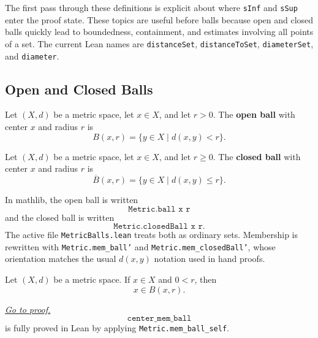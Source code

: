 \begin{remark*}
The first pass through these definitions is explicit about where \texttt{sInf}
and \texttt{sSup} enter the proof state. These topics are useful before balls
because open and closed balls quickly lead to boundedness, containment, and
estimates involving all points of a set. The current Lean names are
\texttt{distanceSet}, \texttt{distanceToSet}, \texttt{diameterSet}, and
\texttt{diameter}.
\end{remark*}

\subsection{Open and Closed Balls}

\begin{remark*}
\begin{definition*}
Let $(X,d)$ be a metric space, let $x\in X$, and let $r>0$. The
\textbf{open ball} with center $x$ and radius $r$ is
\[
  B(x,r)=\{y\in X\mid d(x,y)<r\}.
\]
\end{definition*}
\end{remark*}

\begin{remark*}
\begin{definition*}
Let $(X,d)$ be a metric space, let $x\in X$, and let $r\geq 0$. The
\textbf{closed ball} with center $x$ and radius $r$ is
\[
  \overline{B}(x,r)=\{y\in X\mid d(x,y)\leq r\}.
\]
\end{definition*}
\end{remark*}

\begin{remark*}
In mathlib, the open ball is written
\[
  \texttt{Metric.ball x r}
\]
and the closed ball is written
\[
  \texttt{Metric.closedBall x r}.
\]
The active file \texttt{MetricBalls.lean} treats both as ordinary sets.
Membership is rewritten with \texttt{Metric.mem\_ball'} and
\texttt{Metric.mem\_closedBall'}, whose orientation matches the usual
\(d(x,y)\) notation used in hand proofs.
\end{remark*}

\begin{remark*}
\label{thm:fv-msml-center-mem-ball}
\begin{theorem*}
Let $(X,d)$ be a metric space. If $x\in X$ and $0<r$, then
\[
  x\in B(x,r).
\]
\end{theorem*}
\hyperref[prf:fv-msml-center-mem-ball]{\textit{Go to proof.}}
\[
  \texttt{center\_mem\_ball}
\]
is fully proved in Lean by applying \texttt{Metric.mem\_ball\_self}.
\end{remark*}

